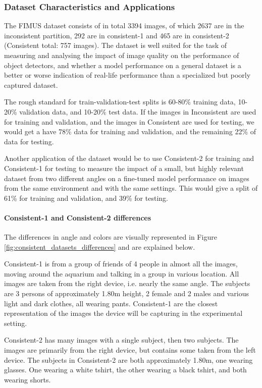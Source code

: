\subsubsection{Dataset Characteristics and Applications}
The FIMUS dataset consists of in total 3394 images, of which 2637 are in the inconsistent partition, 292 are in consistent-1 and 465 are in consistent-2 (Consistent total: 757 images). The dataset is well suited for the task of measuring and analysing the impact of image quality on the performance of object detectors, and whether a model performance on a general dataset is a better or worse indication of real-life performance than a specialized but poorly captured dataset. 

The rough standard for train-validation-test splits is 60-80\% training data, 10-20\% validation data, and 10-20\% test data. If the images in Inconsistent are used for training and validation, and the images in Consistent are used for testing, we would get a have 78\% data for training and validation, and the remaining 22\% of data for testing. 

Another application of the dataset would be to use Consistent-2 for training and Consistent-1 for testing to measure the impact of a small, but highly relevant dataset from two different angles on a fine-tuned model performance on images from the same environment and with the same settings. This would give a split of 61\% for training and validation, and 39\% for testing.

\paragraph{Consistent-1 and Consistent-2 differences}
\label{sec:consistent_datasets_differences}
The differences in angle and colors are visually represented in Figure \ref{fig:consistent_datasets_differences} and are explained below.

Consistent-1 is from a group of friends of 4 people in almost all the images, moving around the aquarium and talking in a group in various location. All images are taken from the right device, i.e. nearly the same angle. The subjects are 3 persons of approximately 1.80m height, 2 female and 2 males and various light and dark clothes, all wearing pants. Consistent-1 are the closest representation of the images the device will be capturing in the experimental setting.

Consistent-2 has many images with a single subject, then two subjects. The images are primarily from the right device, but contains some taken from the left device. The subjects in Consistent-2 are both approximately 1.80m, one wearing glasses. One wearing a white tshirt, the other wearing a black tshirt, and both wearing shorts. 

